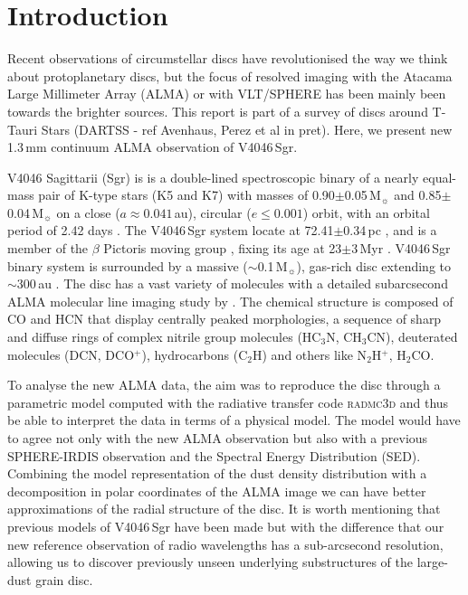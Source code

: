 \documentclass[letters, usenatbib]{mnras}
\begin{document}



\section{Introduction} \label{sec:Introduction}

Recent observations of circumstellar discs have revolutionised the way we think about protoplanetary discs, but the focus of resolved imaging with the Atacama Large Millimeter Array (ALMA) or with VLT/SPHERE has been mainly been towards the brighter sources. This report is part of a survey of discs around T-Tauri Stars (DARTSS - ref Avenhaus, Perez et al in pret). Here, we present new 1.3\,mm continuum ALMA observation of V4046\,Sgr.

V4046 Sagittarii (Sgr) is is a double-lined spectroscopic binary of a nearly equal-mass pair of K-type stars (K5 and K7) with masses of 0.90$\pm$0.05\,M$_{\sun}$ and 0.85$\pm$0.04\,M$_{\sun}$ \citep{Rosenfeld_2012} on a close ($a \approx 0.041$\,au), circular ($e\leq0.001$) orbit, with an orbital period of 2.42 days \citep{refId0}. The V4046\,Sgr system locate at 72.41$\pm$0.34\,pc \citep{Gaia}, and is a member of the $\beta$ Pictoris moving group \citep{Zuckerman_2004}, fixing its age at 23$\pm$3\,Myr \citep{Mamajek_2014}. V4046\,Sgr binary system is surrounded by a massive ($\sim$0.1\,M$_{\sun}$), gas-rich disc extending to $\sim$300\,au \citep{Rosenfeld_2013, Rodriguez_2010}. The disc has a vast variety of molecules with a detailed subarcsecond ALMA molecular line imaging study by \citet{Kastner_2018}. The chemical structure is composed of CO and HCN that display centrally peaked morphologies, a sequence of sharp and diffuse rings of complex nitrile group molecules (HC$_3$N, CH$_3$CN), deuterated molecules (DCN, DCO$^+$), hydrocarbons (C$_2$H) and others like N$_2$H$^+$, H$_2$CO.

To analyse the new ALMA data, the aim was to reproduce the disc through a parametric model computed with the radiative transfer code \textsc{radmc3d} \citep{Dullemond_2012} and thus be able to interpret the data in terms of a physical model. The model would have to agree not only with the new ALMA observation but also with a previous SPHERE-IRDIS observation and the Spectral Energy Distribution (SED). Combining the model representation of the dust density distribution with a decomposition in polar coordinates of the ALMA image we can have better approximations of the radial structure of the disc. It is worth mentioning that previous models of V4046\,Sgr have been made \citep{Ru_z_Rodr_guez_2019, Rosenfeld_2013, 2019ApJ...882..160Q} but with the difference that our new reference observation of radio wavelengths has a sub-arcsecond resolution, allowing us to discover previously unseen underlying substructures of the large-dust grain disc. 
\end{document}
